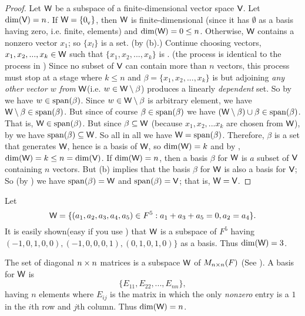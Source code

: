 \begin{proof}
Let \(\textsf{W}\) be a subspace of a finite-dimensional vector space \(\textsf{V}\).
Let \(\dim(\textsf{V}) = n\).
If \(\textsf{W} = \{ 0_{_{\textsf{V}}} \}\), then \(\textsf{W}\) is finite-dimensional
(since it has \(\emptyset\) as a basis having zero, i.e. finite, elements)
and \(\dim(\textsf{W}) = 0 \le n\).
Otherwise, \(\textsf{W}\) contains a nonzero vector \(x_1\);
so \(\{ x_l \}\) is a \LID{} set. (by (b).)
Continue choosing vectors, \(x_1, x_2 , ..., x_k \in \textsf{W}\) such that \(\{ x_1, x_2, ..., x_k \}\) is \LID{}.
(the process is identical to the process in )
Since no \LID{} subset of \(\textsf{V}\) can contain more than \(n\) vectors, this process must stop at a stage where \(k \le n\)  and \(\beta = \{ x_1, x_2, ..., x_k \}\) is \LID{} but adjoining \emph{any other vector \(w\) from} \(\textsf{W}\)(i.e. \(w \in \textsf{W} \setminus \beta\)) produces a linearly \emph{dependent} set.
So by  we have \(w \in \operatorname{span}(\beta)\).
Since \(w \in \textsf{W} \setminus \beta\) is arbitrary element, we have \(\textsf{W} \setminus \beta \in \operatorname{span}(\beta)\).
But since of course \(\beta \in \operatorname{span}(\beta)\) we have \((\textsf{W} \setminus \beta) \cup \beta \in \operatorname{span}(\beta)\).
That is, \(\textsf{W} \in \operatorname{span}(\beta)\).
But since \(\beta \subseteq \textsf{W}\) (because \(x_1, x_2, ... x_k\) are chosen from \(\textsf{W}\)), by  we have \(\operatorname{span}(\beta) \subseteq \textsf{W}\).
So all in all we have \(\textsf{W} = \operatorname{span}(\beta)\).
Therefore, \(\beta\) is a \LID{} set that generates \(\textsf{W}\), hence is a basis of \(\textsf{W}\), so \(\dim(\textsf{W}) = k\) and by , \(\dim(\textsf{W}) = k \le n = \dim(\textsf{V})\).
If \(\dim(\textsf{W}) = n\), then a basis \(\beta\) for \(\textsf{W}\) is \(a\) \LID{} subset of \(\textsf{V}\) containing \(n\) vectors.
But (b) implies that the basis \(\beta\) for \(\textsf{W}\) is also a basis for \(\textsf{V}\);
So (by ) we have \(\operatorname{span}(\beta) = \textsf{W}\) and \(\operatorname{span}(\beta) = \textsf{V}\);
that is, \(\textsf{W} = \textsf{V}\).
\end{proof}

\begin{example} \label{example 1.6.18}
Let
\[
    \textsf{W} = \{ ( a_1, a_2, a_3, a_4, a_5) \in F^5 : a_1 + a_3 + a_5 = 0, a_2 = a_4 \}.
\]
\sloppy It is easily shown(easy if you use ) that \(\textsf{W}\) is a subspace of \(F^5\) having \( (-1, 0, 1, 0, 0), (-1, 0, 0, 0, 1), (0, 1, 0,1, 0)\}\) as a basis.
Thus \(\dim(\textsf{W}) = 3\).
\end{example}

\begin{example} \label{example 1.6.19}
The set of diagonal \(n \times n\) matrices is a subspace \(\textsf{W}\) of \(M_{n \times n}(F)\) (See ).
A basis for \(\textsf{W}\) is
\[
    \{ E_{11}, E_{22}, ..., E_{nn} \},
\]
having \(n\) elements where \(E_{ij}\) is the matrix in which the only \emph{nonzero} entry is a \(1\) in the \(i\)th row and \(j\)th column.
Thus \(\dim(\textsf{W}) = n\).
\end{example}

